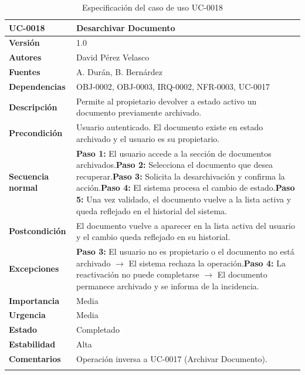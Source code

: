 \documentclass[11pt, a4paper]{article}
\begin{document}
\begin{longtable}{|p{4cm}|p{10cm}|}
\hline
\textbf{UC-0018} & Desarchivar Documento \\
\hline
\textbf{Versión} & 1.0 \\
\hline
\textbf{Autores} & David Pérez Velasco \\
\hline
\textbf{Fuentes} & A. Durán, B. Bernárdez \\
\hline
\textbf{Dependencias} & OBJ-0002, OBJ-0003, IRQ-0002, NFR-0003, UC-0017 \\
\hline
\textbf{Descripción} & Permite al propietario devolver a estado activo un documento previamente archivado. \\
\hline
\textbf{Precondición} & Usuario autenticado. El documento existe en estado archivado y el usuario es su propietario. \\
\hline
\textbf{Secuencia normal} & \textbf{Paso 1:} El usuario accede a la sección de documentos archivados.\newline\textbf{Paso 2:} Selecciona el documento que desea recuperar.\newline\textbf{Paso 3:} Solicita la desarchivación y confirma la acción.\newline\textbf{Paso 4:} El sistema procesa el cambio de estado.\newline\textbf{Paso 5:} Una vez validado, el documento vuelve a la lista activa y queda reflejado en el historial del sistema. \\
\hline
\textbf{Postcondición} & El documento vuelve a aparecer en la lista activa del usuario y el cambio queda reflejado en su historial. \\
\hline
\textbf{Excepciones} & \textbf{Paso 3:} El usuario no es propietario o el documento no está archivado $\rightarrow$ El sistema rechaza la operación.\newline\textbf{Paso 4:} La reactivación no puede completarse $\rightarrow$ El documento permanece archivado y se informa de la incidencia. \\
\hline
\textbf{Importancia} & Media \\
\hline
\textbf{Urgencia} & Media \\
\hline
\textbf{Estado} & Completado \\
\hline
\textbf{Estabilidad} & Alta \\
\hline
\textbf{Comentarios} & Operación inversa a UC-0017 (Archivar Documento). \\
\hline
\caption{Especificación del caso de uso UC-0018}
\end{longtable}
\end{document}
